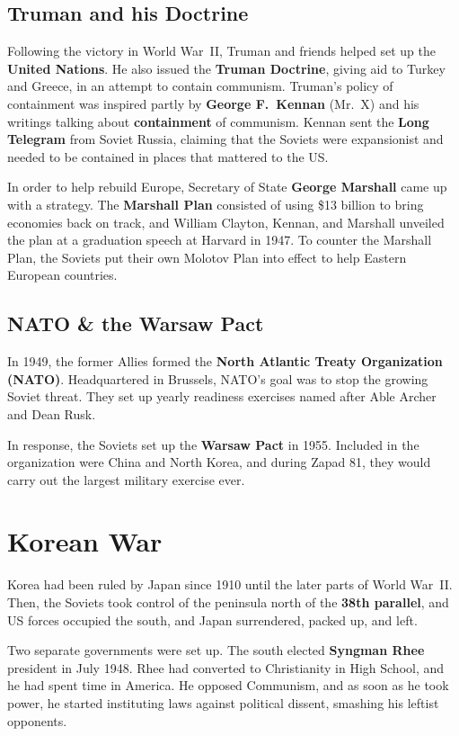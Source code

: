 \subsection*{Truman and his Doctrine}

Following the victory in World War~II, Truman and friends helped set up the \textbf{United Nations}.
He also issued the \textbf{Truman Doctrine}, giving aid to Turkey and Greece,
in an attempt to contain communism.
Truman's policy of containment was inspired partly by \textbf{George F.\ Kennan} (Mr.\ X)
and his writings talking about \textbf{containment} of communism.
Kennan sent the \textbf{Long Telegram} from Soviet Russia,
claiming that the Soviets were expansionist and needed to be contained in places that mattered to the US\@.

In order to help rebuild Europe,
Secretary of State \textbf{George Marshall} came up with a strategy.
The \textbf{Marshall Plan} consisted of using \$13 billion to bring economies back on track,
and William Clayton, Kennan,
and Marshall unveiled the plan at a graduation speech at Harvard in 1947.
To counter the Marshall Plan,
the Soviets put their own Molotov Plan into effect to help Eastern European countries.

\subsection*{NATO \& the Warsaw Pact}

In 1949, the former Allies formed the \textbf{North Atlantic Treaty Organization (NATO)}.
Headquartered in Brussels, NATO's goal was to stop the growing Soviet threat.
They set up yearly readiness exercises named after Able Archer and Dean Rusk.

In response, the Soviets set up the \textbf{Warsaw Pact} in 1955.
Included in the organization were China and North Korea,
and during Zapad 81, they would carry out the largest military exercise ever.

\section{Korean War}

Korea had been ruled by Japan since 1910 until the later parts of World War~II\@.
Then, the Soviets took control of the peninsula north of the \textbf{38th parallel},
and US forces occupied the south, and Japan surrendered, packed up, and left.

Two separate governments were set up.
The south elected \textbf{Syngman Rhee} president in July 1948.
Rhee had converted to Christianity in High School, and he had spent time in America.
He opposed Communism, and as soon as he took power,
he started instituting laws against political dissent, smashing his leftist opponents.


